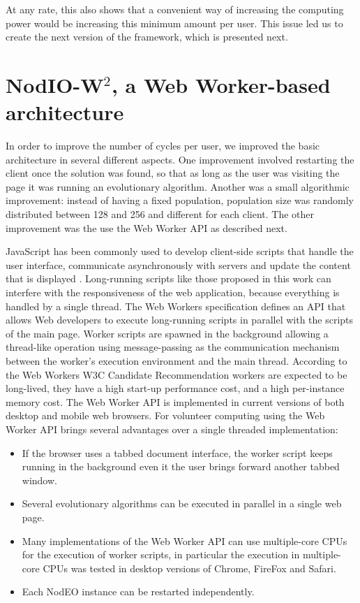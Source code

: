 \documentclass[journal,onecolumn]{IEEEtran}
\begin{document}
At any rate, this also shows that a convenient way of increasing the
computing power would be increasing this minimum amount per user. This
issue led us to create the next version of the framework, which is
presented next. 

\section{{\sf NodIO-W$^2$}, a Web Worker-based architecture}
\label{sec:w2}

In order to improve the number of cycles per user, we improved the
basic architecture in several different aspects.  One improvement 
involved restarting the client once the solution was
found, so that as long as the user was visiting the page it was
running an evolutionary algorithm. Another was a small algorithmic
improvement: instead of having a fixed population,
population size was randomly distributed between 128 and 256 and
different for each client.  The other improvement was the 
use the Web Worker API as described next.

JavaScript has been commonly used to develop client-side scripts
that handle the user interface, communicate asynchronously with servers and
update the content that is displayed \cite{flanagan2006javascript}.
Long-running scripts like those proposed in this work can interfere with the
responsiveness of the web application, because everything is handled by a
single thread. The Web Workers specification \cite{hickson2012web} defines an
API that allows Web developers to execute long-running scripts in parallel
with the scripts of the main page. Worker scripts are spawned in the
background allowing a thread-like operation using message-passing as the
communication mechanism between the worker's execution environment and the
main thread. According to the Web Workers W3C Candidate Recommendation
\cite{hickson2012web} workers are expected to be long-lived, they have a high
start-up performance cost, and a high per-instance memory cost. The Web Worker
API is implemented in current versions of both desktop and mobile web browsers.
For volunteer computing using the Web Worker API brings several advantages
over a single threaded implementation:

\begin{itemize}
\item If the browser uses a tabbed document interface, the worker script
keeps running in the background even it the user brings forward another tabbed
window.
\item Several evolutionary algorithms can be executed in parallel in a single web
page. 
\item Many implementations of the Web Worker API can use multiple-core CPUs for
the execution of worker scripts, in particular the execution in multiple-core CPUs
was tested in desktop versions of Chrome, FireFox and Safari.
\item Each NodEO instance can be restarted independently.
\end{itemize}
\end{document}
